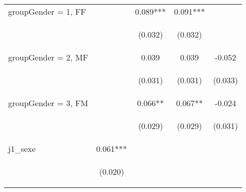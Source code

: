 \begin{center}
\begin{tabular}{lcccc}
groupGender = 1, FF &  & 0.089*** & 0.091*** &  \\
\vspace{4pt} & \begin{footnotesize}\end{footnotesize} & \begin{footnotesize}(0.032)\end{footnotesize} & \begin{footnotesize}(0.032)\end{footnotesize} & \begin{footnotesize}\end{footnotesize} \\
groupGender = 2, MF &  & 0.039 & 0.039 & -0.052 \\
\vspace{4pt} & \begin{footnotesize}\end{footnotesize} & \begin{footnotesize}(0.031)\end{footnotesize} & \begin{footnotesize}(0.031)\end{footnotesize} & \begin{footnotesize}(0.033)\end{footnotesize} \\
groupGender = 3, FM &  & 0.066** & 0.067** & -0.024 \\
\vspace{4pt} & \begin{footnotesize}\end{footnotesize} & \begin{footnotesize}(0.029)\end{footnotesize} & \begin{footnotesize}(0.029)\end{footnotesize} & \begin{footnotesize}(0.031)\end{footnotesize} \\
j1\_sexe & 0.061*** &  &  &  \\
\vspace{4pt} & \begin{footnotesize}(0.020)\end{footnotesize} & \begin{footnotesize}\end{footnotesize} & \begin{footnotesize}\end{footnotesize} & \begin{footnotesize}\end{footnotesize} \\

\end{tabular}
\end{center}
